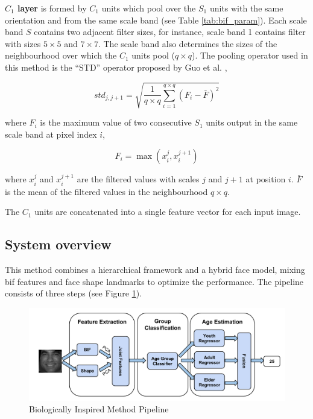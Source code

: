 \textbf{$C_1$ layer} is formed by $C_1$ units which pool over the $S_1$ units with the same orientation and from the same scale band (see Table \ref{tab:bif_param}). Each scale band $S$ contains two adjacent filter sizes, for instance, scale band 1 contains filter with sizes $5\times5$ and $7\times7$. The scale band also determines the sizes of the neighbourhood over which the $C_1$ units pool ($q\times q$). The pooling operator used in this method is the ``STD'' operator proposed by Guo et al. \cite{conf/cvpr/GuoMFH09},

\begin{equation}
std_{j,j+1} = \sqrt{\frac{1}{q\times q}\sum_{i=1}^{q\times q}(F_i - \bar{F})^2} 
\end{equation}

where $F_i$ is the maximum value of two consecutive $S_1$ units output in the same scale band at pixel index $i$, 

\begin{equation}
F_i = \max(x_i^j,x_i^{j+1})
\end{equation}

where $x_i^j$ and $x_i^{j+1}$ are the filtered values with scales $j$ and $j+1$ at position $i$. $\bar{F}$ is the mean of the filtered values in the neighbourhood $q\times q$.

The $C_1$ units are concatenated into a single feature vector for each input image.


\subsection{System overview}

This method combines a hierarchical framework and a hybrid face model, mixing \gls{bif} features and face shape landmarks to optimize the performance. The pipeline consists of three steps (see Figure \ref{fig:pipeline}).

\begin{figure}[!h]
	\centering
	\includegraphics[width=\textwidth]{figures/pipeline}
	\caption{Biologically Inspired Method Pipeline}
	\label{fig:pipeline}
\end{figure}

